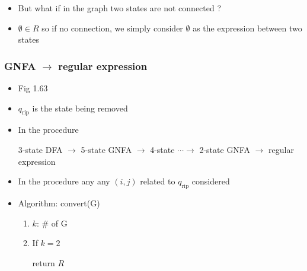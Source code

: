 \begin{frame}[allowframebreaks]
\begin{itemize}
\item [] But what if in the graph two states are not connected ?

\item [] $\emptyset \in R$ so if no connection, we simply consider
  $\emptyset$ as the expression between two states
\end{itemize}\end{frame} \begin{frame}[allowframebreaks] \frametitle{GNFA $\rightarrow$ regular expression}
    \begin{itemize}
\item Fig 1.63

  \begin{center}
\end{center}


  \begin{center}
\end{center}
\item $q_{\text{rip}}$ is the state being removed
\item In the procedure 
  
3-state DFA $\rightarrow $ 5-state GNFA
$\rightarrow$ 4-state $\cdots \rightarrow$ 2-state GNFA $\rightarrow$
regular expression
\item In the procedure any any $(i,j)$ related to $q_{\text{rip}}$ considered
\item Algorithm: convert(G)
  \begin{enumerate}
  \item $k$: \# of G
  \item If $k=2$
    \begin{center}
      return $R$
    \end{center}


\end{enumerate}
\end{itemize}
\end{frame}
